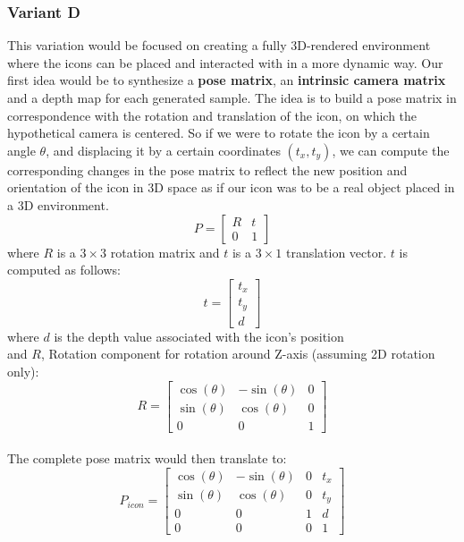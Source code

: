 \subsubsection{Variant D}
This variation would be focused on creating a fully 3D-rendered environment
where the icons can be placed and interacted with in a more dynamic way. Our
first idea would be to synthesize a \textbf{pose matrix}, an \textbf{intrinsic
    camera matrix} and a depth map for each generated sample. The idea is to build
a pose matrix in correspondence with the rotation and translation of the icon,
on which the hypothetical camera is centered. So if we were to rotate the icon
by a certain angle $\theta$, and displacing it by a certain coordinates
$(t_x,t_y)$, we can compute the corresponding changes in the pose matrix to
reflect the new position and orientation of the icon in 3D space as if our icon
was to be a real object placed in a 3D environment.
\[
    P =
    \begin{bmatrix}
        R & t \\
        0 & 1
    \end{bmatrix}
\]
where $R$ is a $3\times3$ rotation matrix and $t$ is a $3\times1$ translation
vector. $t$ is computed as follows:
\[
    t =
    \begin{bmatrix}
        t_x \\
        t_y \\
        d
    \end{bmatrix}
\]
{\footnotesize * where $d$ is the depth value associated with the icon's position}\\
and $R$, Rotation component for rotation around Z-axis (assuming 2D rotation only):
\[
    R =
    \begin{bmatrix}
        \cos(\theta) & -\sin(\theta) & 0 \\
        \sin(\theta) & \cos(\theta)  & 0 \\
        0            & 0             & 1
    \end{bmatrix}
\] \\
The complete pose matrix would then translate to:
\[
    P_{icon} =
    \begin{bmatrix}
        \cos(\theta) & -\sin(\theta) & 0 & t_x \\
        \sin(\theta) & \cos(\theta)  & 0 & t_y \\
        0            & 0             & 1 & d   \\
        0            & 0             & 0 & 1
    \end{bmatrix}
\] \\
